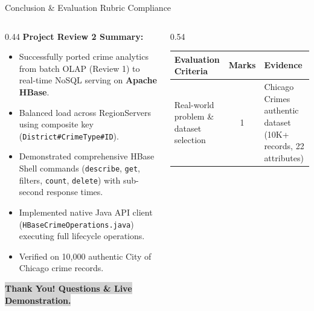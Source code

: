 \documentclass[aspectratio=169]{beamer}
\begin{document}
\begin{frame}{Conclusion \& Evaluation Rubric Compliance}
    \begin{columns}[T]
        \begin{column}{0.44\textwidth}
            \textbf{\textcolor{NavyBlue}{Project Review 2 Summary:}}
            \begin{itemize}\scriptsize
                \setlength{\itemsep}{2pt}
                \item Successfully ported crime analytics from batch OLAP (Review 1) to real-time NoSQL serving on \textbf{Apache HBase}.
                \item Balanced load across RegionServers using composite key (\texttt{District\#CrimeType\#ID}).
                \item Demonstrated comprehensive HBase Shell commands (\texttt{describe}, \texttt{get}, filters, \texttt{count}, \texttt{delete}) with sub-second response times.
                \item Implemented native Java API client (\texttt{HBaseCrimeOperations.java}) executing full lifecycle operations.
                \item Verified on 10,000 authentic City of Chicago crime records.
            \end{itemize}
            \vspace{0.1cm}
            \centering
            \colorbox{LightGray}{\textbf{\scriptsize\textcolor{AmritaMaroon}{Thank You! Questions \& Live Demonstration.}}}
        \end{column}
        \begin{column}{0.54\textwidth}
            \vspace{-0.15cm}
            {\fontsize{5.8}{7.2}\selectfont
            \begin{table}
                \centering
                \setlength{\tabcolsep}{3.5pt}
                \renewcommand{\arraystretch}{1.12}
                \begin{tabular}{>{\raggedright\arraybackslash}p{2.55cm}cp{3.45cm}}
                    \toprule
                    \textbf{Evaluation Criteria} & \textbf{Marks} & \textbf{Evidence} \\
                    \midrule
                    Real-world problem \& dataset selection & 1 & Chicago Crimes authentic dataset (10K+ records, 22 attributes) \\

\end{tabular}
\end{table}}
\end{column}
\end{columns}
\end{frame}
\end{document}
